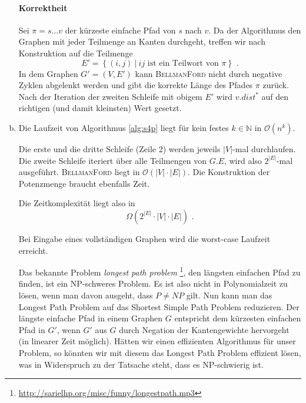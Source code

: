 \documentclass[a4paper]{scrartcl}
\begin{document}
\begin{enumerate}[(a)]
        \paragraph{Korrektheit}
        Sei $\pi = s \ldots v$ der kürzeste einfache Pfad von $s$ nach $v$.
        Da der Algorithmus den Graphen mit jeder Teilmenge an Kanten durchgeht,
        treffen wir nach Konstruktion auf die Teilmenge
        \begin{equation}
            E' = \left\{ (i, j) \ \vert\  ij \text{ ist ein Teilwort von } \pi \right\} \text{ .}
        \end{equation}
        In dem Graphen $G' = (V, E')$ kann \textsc{BellmanFord} nicht durch
        negative Zyklen abgelenkt werden und gibt die korrekte Länge des Pfades
        $\pi$ zurück.
        Nach der Iteration der zweiten Schleife mit obigem $E'$ wird $v.dist^*$
        auf den richtigen (und damit kleinsten) Wert gesetzt.
        

    \item
        Die Laufzeit von Algorithmus \ref{alg:s4p} liegt für kein festes
        $k \in \mathbb{N}$ in $\mathcal{O} (n^k)$.

        Die erste und die dritte Schleife (Zeile 2) werden jeweils $|V|$-mal
        durchlaufen.
        Die zweite Schleife iteriert über alle Teilmengen von $G.E$, wird also
        $2^{|E|}$-mal ausgeführt.
        \textsc{BellmanFord} liegt in $\mathcal{O}(|V| \cdot |E|)$.
        Die Konstruktion der Potenzmenge braucht ebenfalls Zeit.
        
        Die Zeitkomplexität liegt also in
        \begin{equation}
            \Omega \left( 2^{|E|} \cdot |V| \cdot |E| \right) \text{ .}
        \end{equation}

        Bei Eingabe eines vollständigen Graphen wird die worst-case Laufzeit
        erreicht.

        Das bekannte Problem \emph{longest path problem}
        \footnote{\url{http://sarielhp.org/misc/funny/longestpath.mp3}},
        den längsten einfachen Pfad zu finden, ist ein NP-schweres Problem.
        Es ist also nicht in Polynomialzeit zu lösen, wenn man davon ausgeht,
        dass $P \neq NP$ gilt.
        Nun kann man das Longest Path Problem auf das Shortest Simple Path
        Problem reduzieren.
        Der längste einfache Pfad in einem Graphen $G$ entspricht dem kürzesten
        einfachen Pfad in $G'$, wenn $G'$ aus $G$ durch Negation der
        Kantengewichte hervorgeht (in linearer Zeit möglich).
        Hätten wir einen effizienten Algorithmus für unser Problem, so könnten
        wir mit diesem das Longest Path Problem effizient lösen, was in
        Widerspruch zu der Tatsache steht, dass es NP-schwierig ist.



\end{enumerate}
\end{document}
